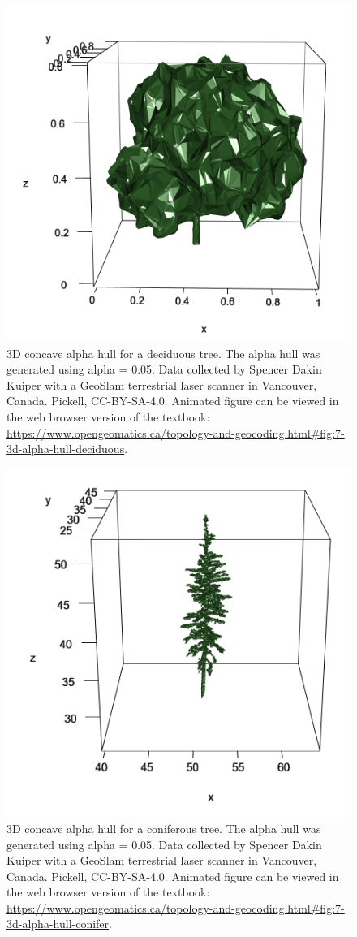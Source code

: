 \documentclass[
]{book}
\begin{document}
\begin{figure}
\includegraphics[width=0.75\linewidth]{images/07-3d-alpha-hull-deciduous-static} \caption{3D concave alpha hull for a deciduous tree. The alpha hull was generated using alpha = 0.05. Data collected by Spencer Dakin Kuiper with a GeoSlam terrestrial laser scanner in Vancouver, Canada. Pickell, CC-BY-SA-4.0. Animated figure can be viewed in the web browser version of the textbook: \url{https://www.opengeomatics.ca/topology-and-geocoding.html\#fig:7-3d-alpha-hull-deciduous}.}\label{fig:7-3d-alpha-hull-deciduous}
\end{figure}





\begin{figure}
\includegraphics[width=0.75\linewidth]{images/07-3d-alpha-hull-conifer-static} \caption{3D concave alpha hull for a coniferous tree. The alpha hull was generated using alpha = 0.05. Data collected by Spencer Dakin Kuiper with a GeoSlam terrestrial laser scanner in Vancouver, Canada. Pickell, CC-BY-SA-4.0. Animated figure can be viewed in the web browser version of the textbook: \url{https://www.opengeomatics.ca/topology-and-geocoding.html\#fig:7-3d-alpha-hull-conifer}.}\label{fig:7-3d-alpha-hull-conifer}
\end{figure}
\end{document}
